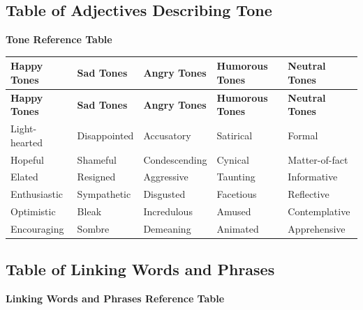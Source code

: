 \documentclass[a4paper]{article}
\begin{document}
\newpage
\subsection{Table of Adjectives Describing Tone}

\begin{center}
\textbf{\LARGE Tone Reference Table}
\end{center}

\begin{longtable}{|p{2cm}|p{2cm}|p{2cm}|p{2cm}|p{2cm}|}
\hline
\textbf{Happy Tones} & \textbf{Sad Tones} & \textbf{Angry Tones} & \textbf{Humorous Tones} & \textbf{Neutral Tones} \\
\hline
\endfirsthead

\hline
\textbf{Happy Tones} & \textbf{Sad Tones} & \textbf{Angry Tones} & \textbf{Humorous Tones} & \textbf{Neutral Tones} \\
\hline
\endhead

Light-hearted & Disappointed & Accusatory & Satirical & Formal \\
Hopeful & Shameful & Condescending & Cynical & Matter-of-fact \\
Elated & Resigned & Aggressive & Taunting & Informative \\
Enthusiastic & Sympathetic & Disgusted & Facetious & Reflective \\
Optimistic & Bleak & Incredulous & Amused & Contemplative \\
Encouraging & Sombre & Demeaning & Animated & Apprehensive \\
\hline

\end{longtable}
\newpage
\subsection{Table of Linking Words and Phrases}

\begin{center}
\textbf{\LARGE Linking Words and Phrases Reference Table}
\end{center}
\end{document}
